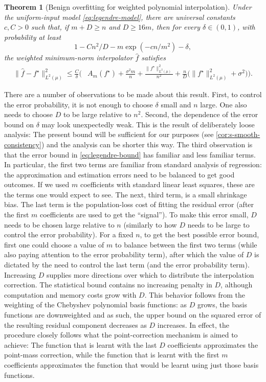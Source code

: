 \documentclass[11pt,twoside]{article}
\newtheorem{theorem}{Theorem}[section]
\theoremstyle{definition}
\theoremstyle{remark}
\begin{document}
\begin{theorem}[Benign overfitting for weighted polynomial interpolation]
\label{thm:weighted-legendre}
Under the uniform-input model \cref{eq:legendre-model}, there are universal
constants $c,C>0$ such that, if $m+D\ge n$ and $D\ge16m$, then for
every $\delta\in(0,1)$, with probability at least
\[
 1-Cn^2/D-m\exp(-cn/m^2)-\delta,
\]
the weighted minimum-norm interpolator $\widehat f$ satisfies
\begin{align}
 \|\widehat f-f^\star\|_{L^2(\mu)}^2
 \le\frac C\delta\bigg(&A_m(f^\star)+\frac{\sigma^2m}{n}
       +\frac{\|f^\star\|_{L^2(\mu)}^2}{n^2}
       +\frac nD\bigl(\|f^\star\|_{L^2(\mu)}^2+\sigma^2\bigr)\bigg).
 \label{eq:legendre-bound}
\end{align}
\end{theorem}

There are a number of observations to be made about this result.
First, to control the error probability, it is not enough to choose $\delta$ small
and $n$ large. One also needs to choose $D$ to be large relative to $n^2$.
Second, the dependence of the error bound on $\delta$ may look unexpectedly
weak. This is the result of deliberately loose analysis: The present bound will be sufficient
for our purposes (see \cref{cor:s-smooth-consistency}) and the analysis can be shorter
this way. The third observation is that the error bound in \cref{eq:legendre-bound} has
familiar and less familiar terms. 
In particular, the first two terms are familiar from
standard analysis of regression: the approximation and estimation errors need to be 
balanced to get good outcomes. If we used $m$ coefficients with standard 
linear least squares, these are the terms one would expect to see.
The next, third term, is a small shrinkage bias.
The last term is the population-loss cost of fitting the residual error
(after the first $m$ coefficients are used to get the ``signal''). To make this 
error small, $D$ needs to be chosen large relative to $n$ (similarly to how
$D$ needs to be large to control the error probability).
For a fixed $n$, to get the best possible error bound,
first one could choose a value of $m$ to balance between the first
two terms (while also paying attention to the error probability term), 
after which the value of $D$ is dictated by the need to control
the last term (and the error probability term).
Increasing $D$ supplies more directions over which to
distribute the interpolation correction. 
The statistical bound contains no increasing penalty in $D$, although
computation and memory costs grow with $D$.
This behavior follows from the weighting of the Chebyshev polynomial
basis functions: as $D$ grows, the basis functions are downweighted
and as such, the upper bound on the squared error of the resulting residual component decreases as $D$ increases.
In effect, the procedure closely follows what the point-correction mechanism is aimed
to achieve: The function that is learnt with the last $D$ coefficients approximates
the point-mass correction, while the function that is learnt with the first $m$ 
coefficients approximates the function that would be learnt using just those basis functions.
\end{document}
